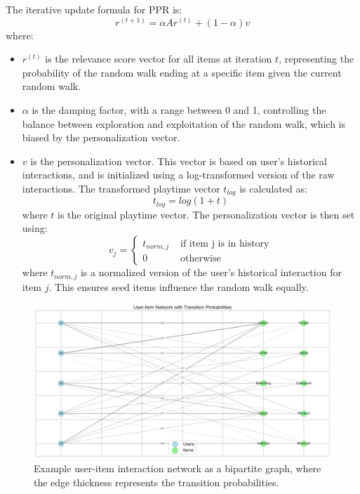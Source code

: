 \documentclass[conference,compsoc]{IEEEtran}
\begin{document}
The iterative update formula for PPR is:
\begin{equation}
    r^{(t+1)} = \alpha A r^{(t)} + (1-\alpha)v
\end{equation}
where:
\begin{itemize}
    \item \(r^{(t)}\) is the relevance score vector for all items at iteration \(t\), representing the probability of the random walk ending at a specific item given the current random walk.
    \item \(\alpha\) is the damping factor, with a range between 0 and 1, controlling the balance between exploration and exploitation of the random walk, which is biased by the personalization vector.
   \item \(v\) is the personalization vector. This vector is based on user's historical interactions, and is initialized using a log-transformed version of the raw interactions. The transformed playtime vector \(t_{log}\) is calculated as:
        \begin{equation}
            t_{log} = log(1+t)
        \end{equation}
where \(t\) is the original playtime vector. The personalization vector is then set using:
     \begin{equation}
     v_j = \begin{cases}
           t_{norm,j} & \text{ if item j is in history} \\
           0 & \text{ otherwise}
       \end{cases}
    \end{equation}
 where $t_{norm,j}$ is a normalized version of the user's historical interaction for item $j$. This ensures seed items influence the random walk equally.
\end{itemize}
\begin{figure}[!ht]
    \centering
    \includegraphics[width=\linewidth]{images/transition_network_fixed.png}
    \caption{Example user-item interaction network as a bipartite graph, where the edge thickness represents the transition probabilities.}
    \label{fig:transition_network}
\end{figure}
\end{document}
